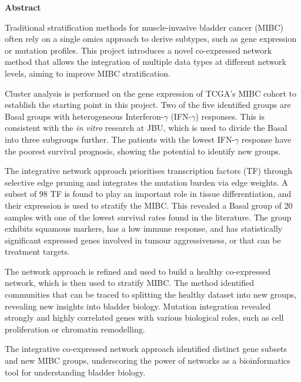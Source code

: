 \thispagestyle{plain}
\begin{center}
    \Large        
    \textbf{Abstract}
    \vspace{0.9cm}
\end{center}


Traditional stratification methods for muscle-invasive bladder cancer (MIBC) often rely on a single omics approach to derive subtypes, such as gene expression or mutation profiles. This project introduces a novel co-expressed network method that allows the integration of multiple data types at different network levels, aiming to improve MIBC stratification. 

Cluster analysis is performed on the gene expression of TCGA's MIBC cohort to establish the starting point in this project. Two of the five identified groups are Basal groups with heterogeneous Interferon-$\gamma$ (IFN-$\gamma$) responses. This is consistent with the \textit{in vitro} research at JBU, which is used to divide the Basal into three subgroups further. The patients with the lowest IFN-$\gamma$ response have the poorest survival prognosis, showing the potential to identify new groups.


% 
The integrative network approach prioritises transcription factors (TF) through selective edge pruning and integrates the mutation burden via edge weights. A subset of 98 TF is found to play an important role in tissue differentiation, and their expression is used to stratify the MIBC. This revealed a Basal group of 20 samples with one of the lowest survival rates found in the literature. The group exhibits squamous markers, has a low immune response, and has statistically significant expressed genes involved in tumour aggressiveness, or that can be treatment targets.


%
The network approach is refined and used to build a healthy co-expressed network, which is then used to stratify MIBC. The method identified communities that can be traced to splitting the healthy dataset into new groups, revealing new insights into bladder biology. Mutation integration revealed strongly and highly correlated genes with various biological roles, such as cell proliferation or chromatin remodelling.


The integrative co-expressed network approach identified distinct gene subsets and new MIBC groups, underscoring the power of networks as a bioinformatics tool for understanding bladder biology.


\newpage
